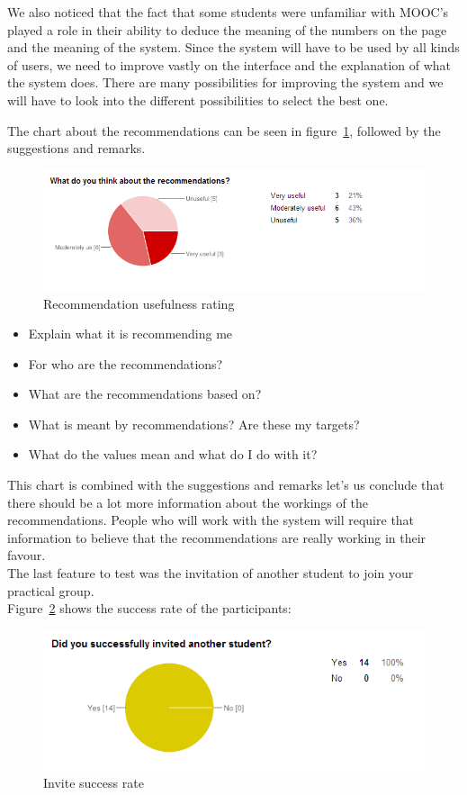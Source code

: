 We also noticed that the fact that some students were unfamiliar with MOOC's played a role in their ability to deduce the meaning of the numbers on the page and the meaning of the system.
Since the system will have to be used by all kinds of users, we need to improve vastly on the interface and the explanation of what the system does.
There are many possibilities for improving the system and we will have to look into the different possibilities to select the best one.

The chart about the recommendations can be seen in figure~\ref{recommendations_chart}, followed by the suggestions and remarks.\\
\begin{figure}[h]
    \centering
    \includegraphics[width=\textwidth]{images/recommendations_chart}
    \caption{Recommendation usefulness rating}
    \label{recommendations_chart}
\end{figure}

\begin{itemize}
\item Explain what it is recommending me
\item For who are the recommendations?
\item What are the recommendations based on?
\item What is meant by recommendations? Are these my targets?
\item What do the values mean and what do I do with it?
\end{itemize}
This chart is combined with the suggestions and remarks let's us conclude that there should be a lot more information about the workings of the recommendations.
People who will work with the system will require that information to believe that the recommendations are really working in their favour.\\

The last feature to test was the invitation of another student to join your practical group.\\
Figure~\ref{invite_chart} shows the success rate of the participants:
\begin{figure}[h]
    \centering
    \includegraphics[width=\textwidth]{images/invite_chart}
    \caption{Invite success rate}
    \label{invite_chart}
\end{figure}

